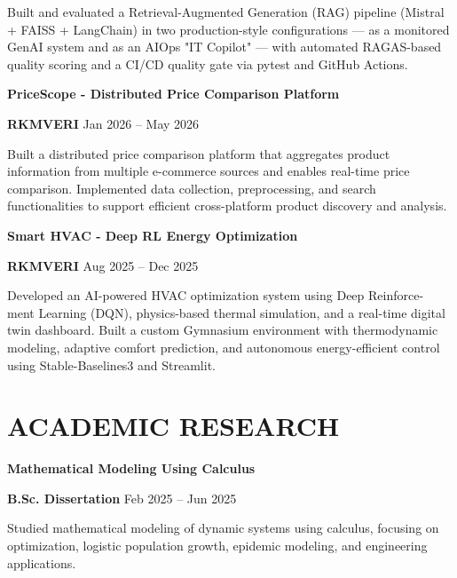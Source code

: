 \documentclass[a4paper,9pt]{article}
\begin{document}
\begin{minipage}[t]{0.58\textwidth}
Built and evaluated a Retrieval-Augmented Generation (RAG) pipeline (Mistral + FAISS + LangChain) in two production-style configurations — as a monitored GenAI system and as an AIOps "IT Copilot" — with automated RAGAS-based quality scoring and a CI/CD quality gate via pytest and GitHub Actions.


\vspace{6pt}

\textbf{\color{myblue}PriceScope - Distributed Price Comparison Platform}
\hfill
\href{https://github.com/sayan369369/PriceScope-Distributed-AI-Price-Comparison-Platform}
{\faGithub}

{\footnotesize\textbf{RKMVERI} \hfill Jan 2026 -- May 2026}

Built a distributed price comparison platform that aggregates product information from multiple e-commerce sources and enables real-time price comparison.
Implemented data collection, preprocessing, and search functionalities to support efficient cross-platform product discovery and analysis.

\vspace{6pt}

\textbf{\color{myblue}Smart HVAC - Deep RL Energy Optimization}
\hfill
\href{https://github.com/sayan369369/An-Intelligent-Energy-Brain-for-Smart-Buildings-Smart-HVAC-Project}
{\faGithub}

{\footnotesize\textbf{RKMVERI} \hfill Aug 2025 -- Dec 2025}

Developed an AI-powered HVAC optimization system using Deep Reinforce-
ment Learning (DQN), physics-based thermal simulation, and a real-time digital twin dashboard.
Built a custom Gymnasium environment with thermodynamic modeling,
adaptive comfort prediction, and autonomous energy-efficient control using
Stable-Baselines3 and Streamlit.


\section{ACADEMIC RESEARCH}

\textbf{\color{myblue}Mathematical Modeling Using Calculus}

{\footnotesize\textbf{B.Sc. Dissertation} \hfill Feb 2025 -- Jun 2025}

Studied mathematical modeling of dynamic systems using calculus, focusing on optimization, logistic population growth, epidemic modeling, and engineering applications.

\end{minipage}
\end{document}
